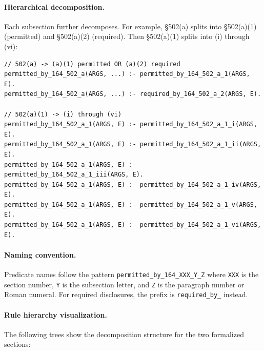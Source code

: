 \documentclass[11pt,letterpaper]{article}
\begin{document}
\paragraph{Hierarchical decomposition.} Each subsection further decomposes. For example, \S 502(a) splits into \S 502(a)(1) (permitted) and \S 502(a)(2) (required). Then \S 502(a)(1) splits into (i) through (vi):

\begin{lstlisting}[style=soufflestyle,caption={Hierarchical decomposition (from hipaa\_164\_502.dl)}]
// 502(a) -> (a)(1) permitted OR (a)(2) required
permitted_by_164_502_a(ARGS, ...) :- permitted_by_164_502_a_1(ARGS, E).
permitted_by_164_502_a(ARGS, ...) :- required_by_164_502_a_2(ARGS, E).

// 502(a)(1) -> (i) through (vi)
permitted_by_164_502_a_1(ARGS, E) :- permitted_by_164_502_a_1_i(ARGS, E).
permitted_by_164_502_a_1(ARGS, E) :- permitted_by_164_502_a_1_ii(ARGS, E).
permitted_by_164_502_a_1(ARGS, E) :- permitted_by_164_502_a_1_iii(ARGS, E).
permitted_by_164_502_a_1(ARGS, E) :- permitted_by_164_502_a_1_iv(ARGS, E).
permitted_by_164_502_a_1(ARGS, E) :- permitted_by_164_502_a_1_v(ARGS, E).
permitted_by_164_502_a_1(ARGS, E) :- permitted_by_164_502_a_1_vi(ARGS, E).
\end{lstlisting}

\paragraph{Naming convention.} Predicate names follow the pattern \texttt{permitted\_by\_164\_XXX\_Y\_Z} where \texttt{XXX} is the section number, \texttt{Y} is the subsection letter, and \texttt{Z} is the paragraph number or Roman numeral. For required disclosures, the prefix is \texttt{required\_by\_} instead.

\paragraph{Rule hierarchy visualization.} The following trees show the decomposition structure for the two formalized sections:
\end{document}
